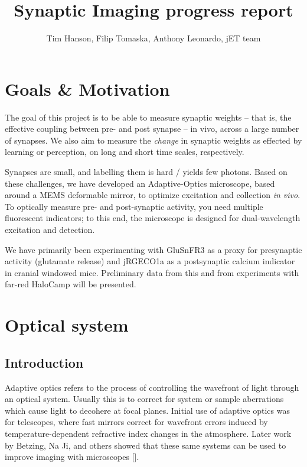 \documentclass[a4paper,12pt]{article}
\title{Synaptic Imaging progress report}
\author{Tim Hanson, Filip Tomaska, Anthony Leonardo, jET team}
\begin{document}
\maketitle

\begin{abstract}

\end{abstract}

\section{Goals \& Motivation}

The goal of this project is to be able to measure synaptic weights -- that is, the effective coupling between pre- and post synapse -- in vivo, across a large number of synapses.  We also aim to measure the \textit{change} in synaptic weights as effected by learning or perception, on long and short time scales, respectively.  

Synapses are small, and labelling them is hard / yields few photons.  Based on these challenges, we have developed an Adaptive-Optics microscope, based around a MEMS deformable mirror, to optimize excitation and collection \textit{in vivo}.  To optically measure pre- and post-synaptic activity, you need multiple fluorescent indicators; to this end, the microscope is designed for dual-wavelength excitation and detection.  

We have primarily been experimenting with GluSnFR3 as a proxy for presynaptic activity (glutamate release) and jRGECO1a as a postsynaptic calcium indicator in cranial windowed mice.  Preliminary data from this and from experiments with far-red HaloCamp will be presented.  

\section{Optical system}

\subsection{Introduction}

Adaptive optics refers to the process of controlling the wavefront of light through an optical system.  Usually this is to correct for system or sample aberrations which cause light to decohere at focal planes.  Initial use of adaptive optics was for telescopes, where fast mirrors correct for wavefront errors induced by temperature-dependent refractive index changes in the atmosphere.  Later work by Betzing, Na Ji, and others showed that these same systems can be used to improve imaging with microscopes [].  
\end{document}
